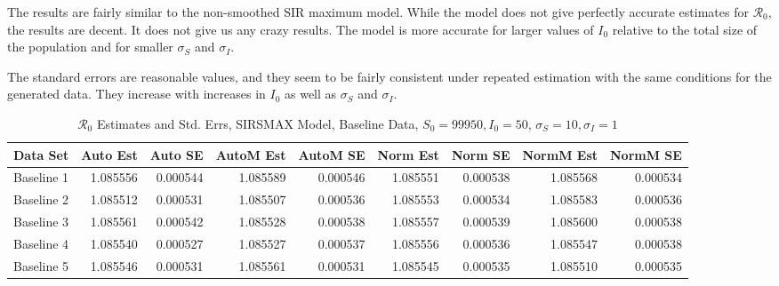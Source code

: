 \documentclass[12pt]{article}
\newcommand{\rr}{\ensuremath{\mathcal{R}_0}}
\begin{document}
The results are fairly similar to the non-smoothed SIR maximum model.  While the model does not give perfectly accurate estimates for $\rr$, the results are decent. It does not give us any crazy results. The model is more accurate for larger values of $I_0$ relative to the total size of the population and for smaller $\sigma_S$ and $\sigma_I$.

The standard errors are reasonable values, and they seem to be fairly consistent under repeated estimation with the same conditions for the generated data.  They increase with increases in $I_0$ as well as $\sigma_S$ and $\sigma_I$.

\begin{table}[H]
	
	\caption{$\rr$ Estimates and Std. Errs, SIRSMAX Model,
		Baseline Data, $S_0 = 99950, I_0 = 50$, 
		$\sigma_S = 10, \sigma_I = 1$}
	\begin{footnotesize}
		\hskip -1cm
	\begin{tabular}{l|r|r|r|r|r|r|r|r}
		\hline
		Data Set & Auto Est & Auto SE & AutoM Est & AutoM SE & Norm Est & Norm SE & NormM Est & NormM SE\\
		\hline
		Baseline 1 & 1.085556 & 0.000544 & 1.085589 & 0.000546 & 1.085551 & 0.000538 & 1.085568 & 0.000534\\
		\hline
		Baseline 2 & 1.085512 & 0.000531 & 1.085507 & 0.000536 & 1.085553 & 0.000534 & 1.085583 & 0.000536\\
		\hline
		Baseline 3 & 1.085561 & 0.000542 & 1.085528 & 0.000538 & 1.085557 & 0.000539 & 1.085600 & 0.000538\\
		\hline
		Baseline 4 & 1.085540 & 0.000527 & 1.085527 & 0.000537 & 1.085556 & 0.000536 & 1.085547 & 0.000538\\
		\hline
		Baseline 5 & 1.085546 & 0.000531 & 1.085561 & 0.000531 & 1.085545 & 0.000535 & 1.085510 & 0.000535\\
		\hline
	\end{tabular}
\end{footnotesize}
\end{table}
\end{document}

